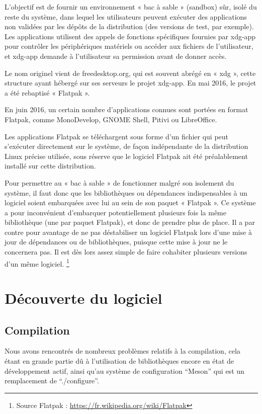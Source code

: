 \documentclass[12pt]{report}
\begin{document}
L'objectif est de fournir un environnement « bac à sable » (sandbox)
sûr, isolé du reste du système, dans lequel les utilisateurs peuvent
exécuter des applications non validées par les dépôts de la
distribution (des versions de test, par exemple). Les applications
utilisent des appels de fonctions spécifiques fournies par xdg-app
pour contrôler les périphériques matériels ou accéder aux fichiers de
l'utilisateur, et xdg-app demande à l'utilisateur sa permission avant
de donner accès.

Le nom originel vient de freedesktop.org, qui est souvent abrégé en «
xdg », cette structure ayant hébergé sur ses serveurs le projet
xdg-app. En mai 2016, le projet a été rebaptisé « Flatpak ».

En juin 2016, un certain nombre d'applications connues sont portées en
format Flatpak, comme MonoDevelop, GNOME Shell, Pitivi ou LibreOffice.

Les applications Flatpak se téléchargent sous forme d'un fichier qui
peut s’exécuter directement sur le système, de façon indépendante de
la distribution Linux précise utilisée, sous réserve que le logiciel
Flatpak ait été préalablement installé sur cette distribution.

Pour permettre au « bac à sable » de fonctionner malgré son isolement
du système, il faut donc que les bibliothèques ou dépendances
indispensables à un logiciel soient embarquées avec lui au sein de son
paquet « Flatpak ». Ce système a pour inconvénient d'embarquer
potentiellement plusieurs fois la même bibliothèque (une par paquet
Flatpak), et donc de prendre plus de place. Il a par contre pour
avantage de ne pas déstabiliser un logiciel Flatpak lors d'une mise à
jour de dépendances ou de bibliothèques, puisque cette mise à jour ne
le concernera pas. Il est dès lors assez simple de faire cohabiter
plusieurs versions d'un même logiciel.
\footnote{Source Flatpak : \url{https://fr.wikipedia.org/wiki/Flatpak}}

\section{Découverte du logiciel}
\subsection{Compilation}
Nous avons rencontrés de nombreux problèmes relatifs à la compilation,
cela étant en grande partie dû à l'utilisation de bibliothèques encore en
état de développement actif, ainsi qu'au système de configuration
``Meson'' qui est un remplacement de ``./configure''.
\end{document}
